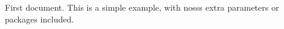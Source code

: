 \documentclass{article}
\begin{document}
First document. This is a simple example, with nosss
extra parameters or packages included.
\end{document}
